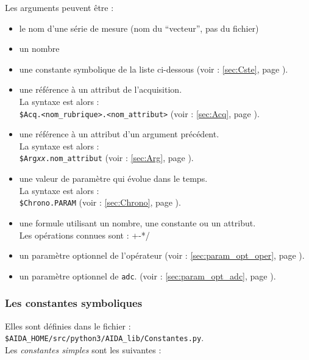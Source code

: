 \medbreak
Les arguments peuvent être :
\begin {itemize}
  \item le nom d'une série de mesure (nom du ``vecteur'', pas du fichier)
  \item un nombre
  \item une constante symbolique de la liste ci-dessous
        (voir : \ref{sec:Cste}, page \pageref{sec:Cste}).
  \item une référence à un attribut de l'acquisition. \\
        La syntaxe est alors : \\
        \texttt{\$Acq.<nom\_rubrique>.<nom\_attribut>}
        (voir : \ref{sec:Acq}, page \pageref{sec:Acq}).
  \item une référence à un attribut d'un argument précédent. \\
        La syntaxe est alors : \\
        \texttt{\$Arg\textit{xx}.nom\_attribut}
        (voir : \ref{sec:Arg}, page \pageref{sec:Arg}).
  \item une valeur de paramètre qui évolue dans le temps. \\
        La syntaxe est alors : \\
        \texttt{\$Chrono.PARAM}
        (voir : \ref{sec:Chrono}, page \pageref{sec:Chrono}).
  \item une formule utilisant un nombre, une constante ou un attribut. \\
        Les opérations connues sont : +-*/
  \item un paramètre optionnel de l'opérateur
        (voir : \ref{sec:param_opt_oper}, page \pageref{sec:param_opt_oper}).
  \item un paramètre optionnel de \texttt{adc}.
        (voir : \ref{sec:param_opt_adc}, page \pageref{sec:param_opt_adc}).
\end {itemize}

\subsubsection{Les constantes symboliques}
  Elles sont définies dans le fichier : \\
\-\hspace{1cm} \texttt{\$AIDA\_HOME/src/python3/AIDA\_lib/Constantes.py}. \\
Les \textit{constantes simples} sont les suivantes :

